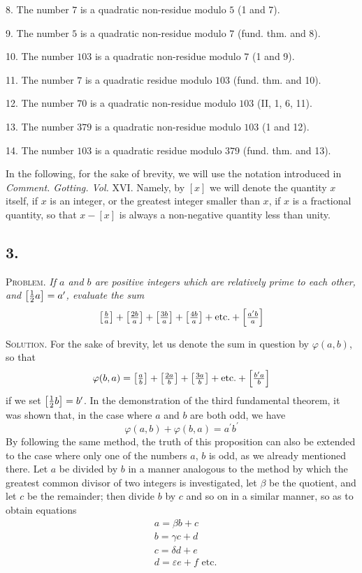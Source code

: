 \documentclass[twoside,12pt]{memoir}
\let\oldfrac\frac
\def\frac#1#2{\mathchoice{\tfrac{#1}{#2}}{\oldfrac{#1}{#2}}{\genfrac{}{}{}{2}{#1}{#2\mathstrut}}{\genfrac{}{}{}{3}{#1}{#2\mathstrut}}}
\begin{document}
8. The number \(7\) is a quadratic non-residue modulo \(5\) (1 and 7).
    
9. The number \(5\) is a quadratic non-residue modulo \(7\) (fund{.} thm{.} and 8).
    
10. The number \(103\) is a quadratic non-residue modulo \(7\) (1 and 9).
    
11. The number \(7\) is a quadratic residue modulo \(103\) (fund{.} thm{.} and 10).
    
12. The number \(70\) is a quadratic non-residue modulo \(103\) (II, 1, 6, 11).
    
13. The number \(379\) is a quadratic non-residue modulo \(103\) (1 and 12).
    
14. The number \(103\) is a quadratic residue modulo \(379\) (fund{.} thm{.} and 13).

\(\)In the following, for the sake of brevity, we will use the notation introduced in \textit{Comment. Gotting. Vol.} XVI. Namely, by \([x]\) we will denote the quantity \(x\) itself, if \(x\) is an integer, or the greatest integer smaller than \(x\), if \(x\) is a fractional quantity, so that \(x-[x]\) is always a non-negative quantity less than unity.

\subsection*{3.}
 
\textsc{Problem.} \textit{If \(a\) and \(b\) are positive integers which are relatively prime to each other, and \(\left[\frac{1}{2} a\right]=a^{\prime}\), evaluate the sum}
\[\left[\frac{b}{a}\right]+\left[\frac{2 b}{a}\right]+\left[\frac{3 b}{a}\right]+\left[\frac{4 b}{a}\right]+\text{etc{.}}+\left[\frac{a^{\prime} b}{a}\right]\]
 
\textsc{Solution.} For the sake of brevity, let us denote the sum in question by \(\varphi(a, b)\), so that
\[\varphi(b, a)=\left[\frac{a}{b}\right]+\left[\frac{2 a}{b}\right]+\left[\frac{3 a}{b}\right]+\text{etc{.}}+\left[\frac{b^{\prime} a}{b}\right]\]
if we set \(\left[\frac{1}{2} b\right]=b^{\prime}\). In the demonstration of the third fundamental theorem, it was shown that, in the case where \(a\) and \(b\) are both odd, we have
\[\varphi(a, b)+\varphi(b, a)=a^{\prime} b^{\prime}\]
By following the same method, the truth of this proposition can also be extended to the case where only one of the numbers \(a\), \(b\) is odd, as we already mentioned there. Let \(a\) be divided by \(b\) in a manner analogous to the method by which the greatest common divisor of two integers is investigated, let \(\beta\) be the quotient, and let \(c\) be the remainder; then divide \(b\) by \(c\) and so on in a similar manner, so as to obtain equations\pagebreak%
\[\begin{aligned}
& a=\beta b+c \\
& b=\gamma c+d \\
& c=\delta d+e \\
& d=\varepsilon e+f \text{ etc{.}}
\end{aligned}\]
 
\end{document}
